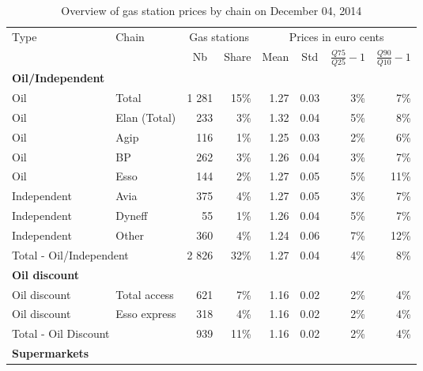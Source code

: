\documentclass[english]{article}
\begin{document}
\begin{table}
\begin{threeparttable}
\caption{Overview of gas station prices by chain on December 04, 2014}
\label{tab:station_chains}
\begin{tabular}{llrr|rrrr}
    \toprule
    \toprule
    Type  & \multicolumn{1}{l}{Chain} & \multicolumn{2}{c|}{Gas stations} & \multicolumn{4}{c}{Prices in euro cents} \\
          &       & \multicolumn{1}{c}{Nb } & \multicolumn{1}{c|}{Share} & \multicolumn{1}{c}{Mean} & \multicolumn{1}{c}{Std} & \multicolumn{1}{c}{$\frac{Q75}{Q25}-1$} & \multicolumn{1}{c}{$\frac{Q90}{Q10}-1$} \\
    \midrule
    \textbf{Oil/Independent} &       &       &       &       &       &       &  \\
    Oil   & Total & 1 281 & 15\%  & 1.27  & 0.03  & 3\%   & 7\% \\
    Oil   & Elan (Total) & 233   & 3\%   & 1.32  & 0.04  & 5\%   & 8\% \\
    Oil   & Agip  & 116   & 1\%   & 1.25  & 0.03  & 2\%   & 6\% \\
    Oil   & BP    & 262   & 3\%   & 1.26  & 0.04  & 3\%   & 7\% \\
    Oil   & Esso  & 144   & 2\%   & 1.27  & 0.05  & 5\%   & 11\% \\
    Independent & Avia  & 375   & 4\%   & 1.27  & 0.05  & 3\%   & 7\% \\
    Independent & Dyneff & 55    & 1\%   & 1.26  & 0.04  & 5\%   & 7\% \\
    Independent & Other & 360   & 4\%   & 1.24  & 0.06  & 7\%   & 12\% \\
    \midrule
    \multicolumn{2}{l}{Total - Oil/Independent} & 2 826 & 32\%  & 1.27  & 0.04  & 4\%   & 8\% \\
    \midrule
    \textbf{Oil discount} &       &       &      &       &       &       &  \\
    Oil discount & Total access & 621   & 7\%   & 1.16  & 0.02  & 2\%   & 4\% \\
    Oil discount & Esso express & 318   & 4\%   & 1.16  & 0.02  & 2\%   & 4\% \\
    \midrule
    \multicolumn{2}{l}{Total - Oil Discount} & 939   & 11\%  & 1.16  & 0.02  & 2\%   & 4\% \\
    \midrule
    \textbf{Supermarkets} &       &       &      &       &       &       &  \\

\end{tabular}
\end{threeparttable}
\end{table}
\end{document}
